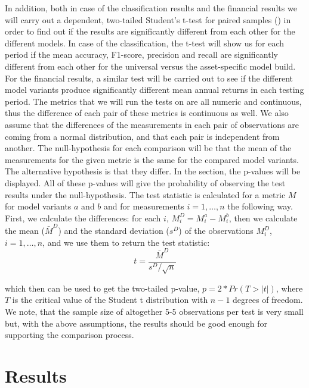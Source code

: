 \documentclass[11pt, a4paper]{article}
\begin{document}
In addition, both in case of the classification results and the financial results we will carry out a dependent, two-tailed Student's t-test for paired samples (\cite{student1908probable}) in order to find out if the results are significantly different from each other for the different models. In case of the classification, the t-test will show us for each period if the mean accuracy, F1-score, precision and recall are significantly different from each other for the universal versus the asset-specific model build. For the financial results, a similar test will be carried out to see if the different model variants produce significantly different mean annual returns in each testing period. The metrics that we will run the tests on are all numeric and continuous, thus the difference of each pair of these metrics is continuous as well. We also assume that the differences of the measurements in each pair of observations are coming from a normal distribution, and that each pair is independent from another. The null-hypothesis for each comparison will be that the mean of the measurements for the given metric is the same for the compared model variants. The alternative hypothesis is that they differ. In the  section, the p-values will be displayed. All of these p-values will give the probability of observing the test results under the null-hypothesis. The test statistic is calculated for a metric $M$ for model variants $a$ and $b$ and for measurements $i = 1, \dots, n$ the following way. First, we calculate the differences: for each $i$, $M_i^D = M_i^a - M_i^b$, then we calculate the mean ($\bar{M}^D$) and the standard deviation ($s^D$) of the observations $M^D_i$, $i = 1, \dots, n$, and we use them to return the test statistic:
\begin{equation}
    \label{eq:ttest}
    t = \frac{\bar{M}^D}{s^D / \sqrt{n}}
\end{equation}

which then can be used to get the two-tailed p-value, $p = 2* Pr(T > |t|)$, where $T$ is the critical value of the Student t distribution with $n-1$ degrees of freedom. We note, that the sample size of altogether 5-5 observations per test is very small but, with the above assumptions, the results should be good enough for supporting the comparison process.

\section{Results}
\label{sec:ER}
\end{document}

